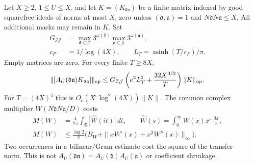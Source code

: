 \begin{proposition}
\label{cbk:schur}
Let $X\ge2$, $1\le U\le X$, and let $K=(K_{\mathfrak d\mathfrak a})$
be a finite matrix indexed by good squarefree ideals of norms at most
$X$, zero unless $(\mathfrak d,\mathfrak a)=1$ and
$N\mathfrak d N\mathfrak a\le X$. All additional masks may remain in
$K$. Set
\[
 \begin{aligned}
 G_{\mathcal I\mathcal J}
  &=\max_{\mathfrak d\in\mathcal I}3^{\omega(\mathfrak d)}
           \max_{\mathfrak a\in\mathcal J}3^{\omega(\mathfrak a)},\\
 c_P&=1/\log(4X),\qquad L_T=\operatorname{asinh}(T/c_P)/\pi.
 \end{aligned}
\]
Empty matrices are zero. For every finite $T\ge8X$,
\begin{equation}\label{cbk:schur-bound}
 \|[A_U(\mathfrak d\mathfrak a)K_{\mathfrak d\mathfrak a}]\|_{\rm op}
 \le G_{\mathcal I\mathcal J}
      \left(e^2L_T^2+\frac{32X^{3/2}}T\right)\|K\|_{\rm op}.
\end{equation}
For $T=(4X)^4$ this is $O_\epsilon(X^\epsilon\log^2(4X))\|K\|$.
The common complex multiplier $W(N\mathfrak d N\mathfrak a/D)$ costs
\begin{equation}\label{cbk:profile-seminorm}
 \begin{aligned}
 M(W)&=\frac1{2\pi}\int_{\mathbb R}|\widehat W(it)|\,dt,\qquad
 \widehat W(s)=\int_0^\infty W(x)x^s\,\frac{dx}{x},\\
 M(W)&\le\frac{\log2}{\pi}
       \bigl(B_W+\|xW'(x)+x^2W''(x)\|_\infty\bigr).
 \end{aligned}
\end{equation}
Two occurrences in a bilinear/Gram estimate cost the square of the
transfer norm. This is not $A_U(\mathfrak d\mathfrak a)=
A_U(\mathfrak d)A_U(\mathfrak a)$ or coefficient shrinkage.
\end{proposition}

